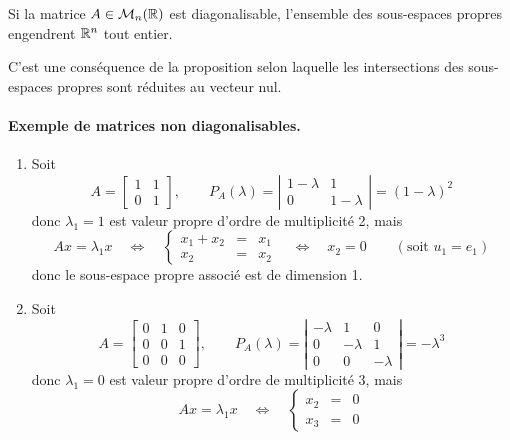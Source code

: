 \begin{corollary*}
  Si la matrice $A \in \mathcal{M}_n(\mathbb{R})$ est diagonalisable, l'ensemble des sous-espaces propres engendrent $\mathbb{R}^n$ tout entier.
\end{corollary*}

\proof
C'est une conséquence de la proposition selon laquelle les intersections des sous-espaces propres sont réduites au vecteur nul.
\eproof

\paragraph*{Exemple de matrices non diagonalisables.}
\begin{enumerate}
 \item Soit
 $$
 A = \left[\begin{array}{cc} 1 & 1 \\ 0 & 1 \end{array}\right],
 \qquad 
 P_A(\lambda) 
 = \left|\begin{array}{cc} 1-\lambda & 1 \\ 0 & 1-\lambda \end{array}\right|
 = (1 - \lambda)^2
 $$
 donc $\lambda_1 = 1$ est valeur propre d'ordre de multiplicité 2, mais
 $$
 Ax = \lambda_1 x \quad \Leftrightarrow \quad 
 \left\{\begin{array}{rcl} x_1 + x_2 & = & x_1 \\ x_2 & = & x_2 \end{array} \right. \quad \Leftrightarrow \quad 
 x_2 = 0
 \qquad (\text{soit } u_1 = e_1)
 $$
 donc le sous-espace propre associé est de dimension 1.
 \item Soit 
 $$
 A = \left[\begin{array}{rrr} 0 & 1 & 0 \\ 0 & 0 & 1 \\ 0 & 0 & 0 \end{array}\right],
 \qquad 
 P_A(\lambda) 
 = \left|\begin{array}{rrr} -\lambda & 1 & 0 \\ 0 & -\lambda & 1 \\ 0 & 0 & -\lambda \end{array}\right|
 = -\lambda^3
 $$
 donc $\lambda_1 = 0$ est valeur propre d'ordre de multiplicité 3, mais
 $$
 A x = \lambda_1 x \quad \Leftrightarrow \quad 
 \left\{\begin{array}{rcl} x_2 & = & 0 \\ x_3 & = & 0 \end{array} \right.
$$
\end{enumerate}
